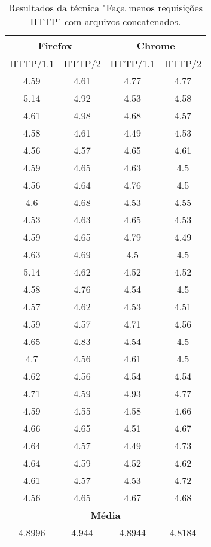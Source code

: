 \begin{table}[H]
	\centering
	\caption{Resultados da técnica "Faça menos requisições HTTP" com arquivos concatenados.}
	\label{resultados-facamenosrequisicoeshttp-concatenados}
	\begin{tabular}{cccc}
		\hline
		\multicolumn{2}{c}{\textbf{Firefox}} & \multicolumn{2}{c}{\textbf{Chrome}} \\
		\hline
		HTTP/1.1 & HTTP/2 & HTTP/1.1 & HTTP/2 \\
		\hline
		4.59 & 4.61 & 4.77 & 4.77 \\
		5.14 & 4.92 & 4.53 & 4.58 \\
		4.61 & 4.98 & 4.68 & 4.57 \\
		4.58 & 4.61 & 4.49 & 4.53 \\
		4.56 & 4.57 & 4.65 & 4.61 \\
		4.59 & 4.65 & 4.63 & 4.5  \\
		4.56 & 4.64 & 4.76 & 4.5  \\
		4.6  & 4.68 & 4.53 & 4.55 \\
		4.53 & 4.63 & 4.65 & 4.53 \\
		4.59 & 4.65 & 4.79 & 4.49 \\
		4.63 & 4.69 & 4.5  & 4.5  \\
		5.14 & 4.62 & 4.52 & 4.52 \\
		4.58 & 4.76 & 4.54 & 4.5  \\
		4.57 & 4.62 & 4.53 & 4.51 \\
		4.59 & 4.57 & 4.71 & 4.56 \\
		4.65 & 4.83 & 4.54 & 4.5  \\
		4.7  & 4.56 & 4.61 & 4.5  \\
		4.62 & 4.56 & 4.54 & 4.54 \\
		4.71 & 4.59 & 4.93 & 4.77 \\
		4.59 & 4.55 & 4.58 & 4.66 \\
		4.66 & 4.65 & 4.51 & 4.67 \\
		4.64 & 4.57 & 4.49 & 4.73 \\
		4.64 & 4.59 & 4.52 & 4.62 \\
		4.61 & 4.57 & 4.53 & 4.72 \\
		4.56 & 4.65 & 4.67 & 4.68 \\
		\hline
		\multicolumn{4}{c}{\textbf{Média}} \\
		4.8996 & 4.944 & 4.8944 & 4.8184 \\
		\hline
	\end{tabular}
\end{table}